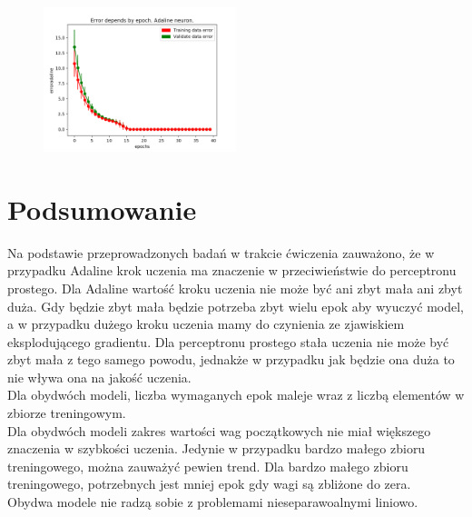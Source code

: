 \documentclass{article}
\begin{document}
	\begin{figure}[h]
		\centering
		\caption{}
		\includegraphics[width=0.5\textwidth]{adaline_and.png}
		
	\end{figure}  
\newpage	
	\section{Podsumowanie}
	
	
	Na podstawie przeprowadzonych badań w trakcie ćwiczenia zauważono, że w przypadku Adaline krok uczenia ma znaczenie w przeciwieństwie do perceptronu prostego. Dla Adaline wartość kroku uczenia nie może być ani zbyt mała ani zbyt duża. Gdy będzie zbyt mała będzie potrzeba zbyt wielu epok aby wyuczyć model, a w przypadku dużego kroku uczenia mamy do czynienia ze zjawiskiem eksplodującego gradientu. Dla perceptronu prostego stała uczenia nie może być zbyt mała z tego samego powodu, jednakże w przypadku jak będzie ona duża to nie wływa ona na jakość uczenia.\\[0.3cm]
	
Dla obydwóch modeli, liczba wymaganych epok maleje wraz z liczbą elementów w zbiorze treningowym.\\[0.3cm]
	
Dla obydwóch modeli zakres wartości wag początkowych nie miał większego znaczenia w szybkości uczenia. Jedynie w przypadku bardzo małego zbioru treningowego, można zauważyć pewien trend. Dla bardzo małego zbioru treningowego, potrzebnych jest mniej epok gdy wagi są zbliżone do zera. \\[0.3cm]

Obydwa modele nie radzą sobie z problemami nieseparawoalnymi liniowo.\\[0.3cm]
\end{document}

